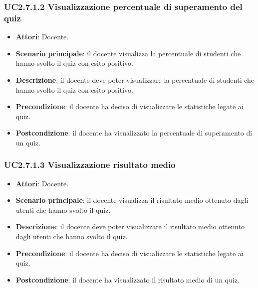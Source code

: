 \subsubsection{UC2.7.1.2 Visualizzazione percentuale di superamento del quiz}
\begin{itemize}
\item \textbf{Attori}: Docente.
\item \textbf{Scenario principale}: il docente visualizza la percentuale di studenti che hanno svolto il quiz con esito positivo.
\item \textbf{Descrizione}: il docente deve poter visualizzare la percentuale di studenti che hanno svolto il quiz con esito positivo.
\item \textbf{Precondizione}: il docente ha deciso di visualizzare le statistiche legate ai quiz.
\item \textbf{Postcondizione}: il docente ha visualizzato la percentuale di superamento di un quiz.
\end{itemize}
\subsubsection{UC2.7.1.3 Visualizzazione risultato medio}
\begin{itemize}
\item \textbf{Attori}: Docente.
\item \textbf{Scenario principale}: il docente visualizza il risultato medio ottenuto dagli utenti che hanno svolto il quiz.
\item \textbf{Descrizione}: il docente deve poter visualizzare il risultato medio ottenuto dagli utenti che hanno svolto il quiz.
\item \textbf{Precondizione}: il docente ha deciso di visualizzare le statistiche legate ai quiz.
\item \textbf{Postcondizione}: il docente ha visualizzato il risultato medio di un quiz.
\end{itemize}
